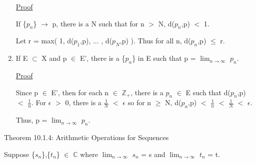 \begin{enumerate}[label=(\alph*), leftmargin=2cm, itemsep=0.4em]
            { \color{magenta} \underline{Proof} }

                If \{$p_n$\} $\rightarrow$ p,
                there is a N such that for n $>$ N, d($p_n$,p) $<$ 1.

                Let r = max( 1, d($p_1$,p), ... , d($p_N$,p) ).
                Thus for all n, d($p_n$,p) $\leq$ r.

        \item If E $\subset$ X and p $\in$ E', there is a \{$p_n$\}
        in E such that p = $\lim_{n \rightarrow \infty}$ $p_n$.

            { \color{magenta} \underline{Proof} }

                Since p $\in$ E', then for each n $\in$ $\mathbb{Z}_+$,
                there is a $p_n$ $\in$ E such that d($p_n$,p) $<$ $\frac{1}{n}$.
                For $\epsilon$ $>$ 0, there is a $\frac{1}{N}$ $<$ $\epsilon$
                so for n $\geq$ N,
                d($p_n$,p) $<$ $\frac{1}{n}$ $<$ $\frac{1}{N}$ $<$ $\epsilon$.

                Thus, p = $\lim_{n \rightarrow \infty}$ $p_n$. \\
    \end{enumerate}

\newpage

{ \color{red} Theorem 10.1.4: Arithmetic Operations for Sequences } 

    \begin{adjustbox}{minipage=14cm, right, vspace=0.1cm 0cm}
        Suppose \{$s_n$\},\{$t_n$\} $\in$ $\mathbb{C}$ where
        $\lim_{n \rightarrow \infty}$ $s_n$ = s and
        $\lim_{n \rightarrow \infty}$ $t_n$ = t.
    \end{adjustbox}

